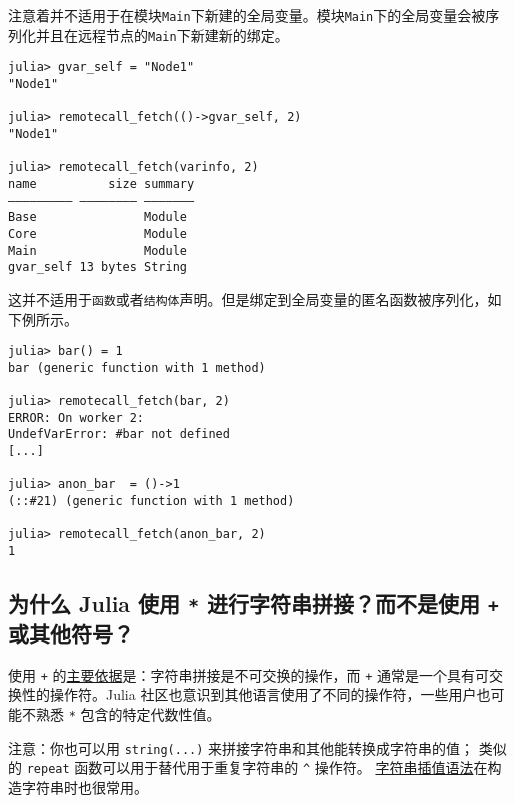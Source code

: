 注意着并不适用于在模块\texttt{Main}下新建的全局变量。模块\texttt{Main}下的全局变量会被序列化并且在远程节点的\texttt{Main}下新建新的绑定。




\begin{verbatim}
julia> gvar_self = "Node1"
"Node1"

julia> remotecall_fetch(()->gvar_self, 2)
"Node1"

julia> remotecall_fetch(varinfo, 2)
name          size summary
––––––––– –––––––– –––––––
Base               Module
Core               Module
Main               Module
gvar_self 13 bytes String
\end{verbatim}



这并不适用于\texttt{函数}或者\texttt{结构体}声明。但是绑定到全局变量的匿名函数被序列化，如下例所示。




\begin{verbatim}
julia> bar() = 1
bar (generic function with 1 method)

julia> remotecall_fetch(bar, 2)
ERROR: On worker 2:
UndefVarError: #bar not defined
[...]

julia> anon_bar  = ()->1
(::#21) (generic function with 1 method)

julia> remotecall_fetch(anon_bar, 2)
1
\end{verbatim}



\hypertarget{6739766638073943445}{}


\subsection{为什么 Julia 使用 \texttt{*} 进行字符串拼接？而不是使用 \texttt{+} 或其他符号？}



使用 \texttt{+}  的\hyperlink{12933998460683957945}{主要依据}是：字符串拼接是不可交换的操作，而 \texttt{+} 通常是一个具有可交换性的操作符。Julia 社区也意识到其他语言使用了不同的操作符，一些用户也可能不熟悉 \texttt{*} 包含的特定代数性值。



注意：你也可以用 \texttt{string(...)} 来拼接字符串和其他能转换成字符串的值； 类似的 \texttt{repeat} 函数可以用于替代用于重复字符串的 \texttt{{\textasciicircum}} 操作符。 \hyperlink{4452850363638134205}{字符串插值语法}在构造字符串时也很常用。



\hypertarget{16669380183019264286}{}


